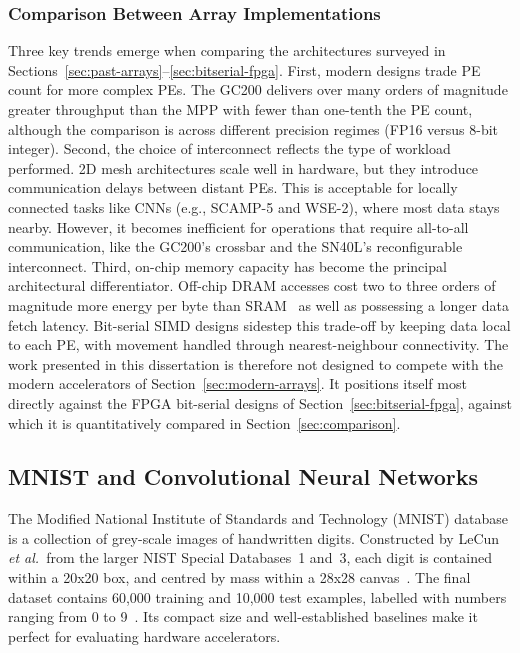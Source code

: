         \subsubsection{Comparison Between Array Implementations}
            Three key trends emerge when comparing the architectures surveyed in Sections~\ref{sec:past-arrays}–\ref{sec:bitserial-fpga}. First, modern designs trade PE count for more complex PEs. The GC200 delivers over many orders of magnitude greater throughput than the MPP with fewer than one-tenth the PE count, although the comparison is across different precision regimes (FP16 versus 8-bit integer). Second, the choice of interconnect reflects the type of workload performed. 2D mesh architectures scale well in hardware, but they introduce communication delays between distant PEs. This is acceptable for locally connected tasks like CNNs (e.g., SCAMP-5 and WSE-2), where most data stays nearby. However, it becomes inefficient for operations that require all-to-all communication, like the GC200’s crossbar and the SN40L’s reconfigurable interconnect. Third, on-chip memory capacity has become the principal architectural differentiator. Off-chip DRAM accesses cost two to three orders of magnitude more energy per byte than SRAM~\cite{ref:horowitz2014} as well as possessing a longer data fetch latency. Bit-serial SIMD designs sidestep this trade-off by keeping data local to each PE, with movement handled through nearest-neighbour connectivity. The work presented in this dissertation is therefore not designed to compete with the modern accelerators of Section~\ref{sec:modern-arrays}. It positions itself most directly against the FPGA bit-serial designs of Section~\ref{sec:bitserial-fpga}, against which it is quantitatively compared in Section~\ref{sec:comparison}.
            
            \subsection{MNIST and Convolutional Neural Networks} 
            
            The Modified National Institute of Standards and Technology (MNIST) database is a collection of grey-scale images of handwritten digits. Constructed by LeCun \textit{et al.}\ from the larger NIST Special Databases~1 and~3, each digit is contained within a 20x20 box, and centred by mass within a 28x28 canvas~\cite{ref:lecun1998gradient}. The final dataset contains 60,000 training and 10,000 test examples, labelled with numbers ranging from 0 to 9~\cite{ref:deng2012mnist}. Its compact size and well-established baselines make it perfect for evaluating hardware accelerators. 
            
